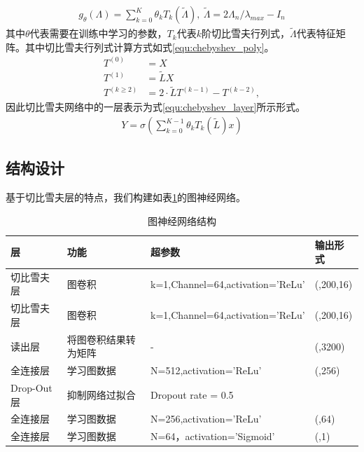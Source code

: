\begin{equation}\label{equ:chebyshev_approx}
\begin{aligned}
g_{\theta}(\Lambda)=\sum_{k=0}^{K}\theta_kT_k(\tilde{\Lambda}),\ \tilde{\Lambda}=2\Lambda_n/\lambda_{max}-I_n
\end{aligned}\end{equation}
其中$\theta$代表需要在训练中学习的参数，$T_k$代表$k$阶切比雪夫行列式，$\tilde{\Lambda}$代表特征矩阵。其中切比雪夫行列式计算方式如式\ref{equ:chebyshev_poly}。
\begin{equation}\label{equ:chebyshev_poly}
\begin{aligned}
T^{(0)} &= X \\
T^{(1)} &= \tilde L X \\
T^{(k \ge 2)} &= 2 \cdot \tilde L T^{(k - 1)} - T^{(k - 2)},
\end{aligned}\end{equation}
因此切比雪夫网络中的一层表示为式\ref{equ:chebyshev_layer}所示形式。
\begin{equation}\label{equ:chebyshev_layer}
\begin{aligned}
Y=\sigma \left(  \sum_{k=0}^{K-1}{\theta_k T_k (\tilde{L})}   x \right) 
\end{aligned}\end{equation}

\subsection{结构设计}

基于切比雪夫层的特点，我们构建如表\ref{tab:GNNstructure}的图神经网络。

\begin{table}[!h]
	\renewcommand{\arraystretch}{1.2}
	\centering\wuhao
	\caption{图神经网络结构} \label{tab:GNNstructure} \vspace{2mm}
	\begin{tabularx}{\textwidth} { 
   >{\centering\arraybackslash}X 
   >{\centering\arraybackslash}X
   >{\centering\arraybackslash}X 
   >{\centering\arraybackslash}X }
	\toprule[1.5pt]
	层          & 功能         & 超参数                              & 输出形式       \\
	\midrule[1pt]
	切比雪夫层      & 图卷积        & k=1,Channel=64,activation='ReLu' & (,200,16)  \\
切比雪夫层      & 图卷积        & k=1,Channel=64,activation='ReLu' & (,200,16)  \\
读出层        & 将图卷积结果转为矩阵 & -                                & (,3200)    \\
全连接层       & 学习图数据      & N=512,activation='ReLu'          & (,256)     \\
Drop-Out 层 & 抑制网络过拟合    & Dropout rate = 0.5               &            \\
全连接层       & 学习图数据      & N=256,activation='ReLu'          & (,64)      \\
全连接层       & 学习图数据      & N=64，activation='Sigmoid'        & (,1)      \\
	\bottomrule[1.5pt]
	\end{tabularx}
\end{table}

